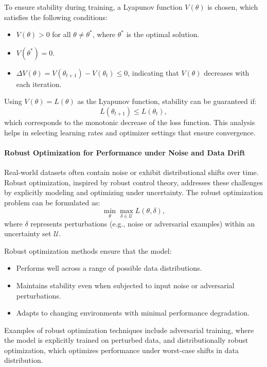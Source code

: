 \documentclass{IEEEojcsys}
\begin{document}
To ensure stability during training, a Lyapunov function $V(\theta)$ is chosen, which satisfies the following conditions:
\begin{itemize}
    \item $V(\theta) > 0$ for all $\theta \neq \theta^*$, where $\theta^*$ is the optimal solution.
    \item $V(\theta^*) = 0$.
    \item $\Delta V(\theta) = V(\theta_{t+1}) - V(\theta_t) \leq 0$, indicating that $V(\theta)$ decreases with each iteration.
\end{itemize}

Using $V(\theta) = L(\theta)$ as the Lyapunov function, stability can be guaranteed if:
\[
L(\theta_{t+1}) \leq L(\theta_t),
\]
which corresponds to the monotonic decrease of the loss function. This analysis helps in selecting learning rates and optimizer settings that ensure convergence.

\paragraph{Robust Optimization for Performance under Noise and Data Drift}
Real-world datasets often contain noise or exhibit distributional shifts over time. Robust optimization, inspired by robust control theory, addresses these challenges by explicitly modeling and optimizing under uncertainty. The robust optimization problem can be formulated as:
\[
\min_{\theta} \max_{\delta \in \mathcal{U}} L(\theta, \delta),
\]
where $\delta$ represents perturbations (e.g., noise or adversarial examples) within an uncertainty set $\mathcal{U}$.

Robust optimization methods ensure that the model:
\begin{itemize}
    \item Performs well across a range of possible data distributions.
    \item Maintains stability even when subjected to input noise or adversarial perturbations.
    \item Adapts to changing environments with minimal performance degradation.
\end{itemize}

Examples of robust optimization techniques include adversarial training, where the model is explicitly trained on perturbed data, and distributionally robust optimization, which optimizes performance under worst-case shifts in data distribution.
\end{document}
